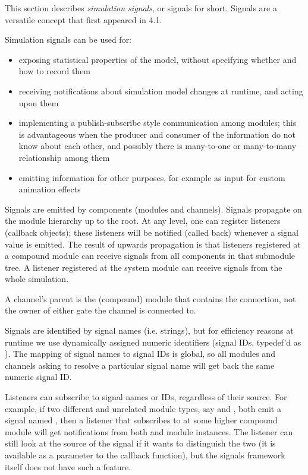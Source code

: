 This section describes \textit{simulation signals}, or signals for short.
Signals are a versatile concept that first appeared in {\opp} 4.1.

Simulation signals can be used for:

\begin{itemize}
  \item exposing statistical properties of the model, without specifying
        whether and how to record them
  \item receiving notifications about simulation model changes at runtime, and
        acting upon them
  \item implementing a publish-subscribe style communication among modules;
        this is advantageous when the producer and consumer of the information
        do not know about each other, and possibly there is many-to-one or
        many-to-many relationship among them
  \item emitting information for other purposes, for example as input for
        custom animation effects
\end{itemize}

Signals are emitted by components (modules and channels). Signals propagate
on the module hierarchy up to the root. At any level, one can register
listeners (callback objects); these listeners will be notified (called
back) whenever a signal value is emitted. The result of upwards propagation
is that listeners registered at a compound module can receive signals from
all components in that submodule tree. A listener registered at the system
module can receive signals from the whole simulation.

\begin{note}
    A channel's parent is the (compound) module that contains the connection,
    not the owner of either gate the channel is connected to.
\end{note}

Signals are identified by signal names (i.e. strings), but for efficiency reasons
at runtime we use dynamically assigned numeric identifiers (signal IDs,
typedef'd as ). The mapping of signal names to signal IDs is
global, so all modules and channels asking to resolve a particular signal name
will get back the same numeric signal ID.

Listeners can subscribe to signal names or IDs, regardless of their
source. For example, if two different and unrelated module types, say
 and , both emit a signal named , then
a listener that subscribes to  at some higher compound module
will get notifications from both  and  module
instances. The listener can still look at the source of the signal if it
wants to distinguish the two (it is available as a parameter to the
callback function), but the signals framework itself does not have such a
feature.

